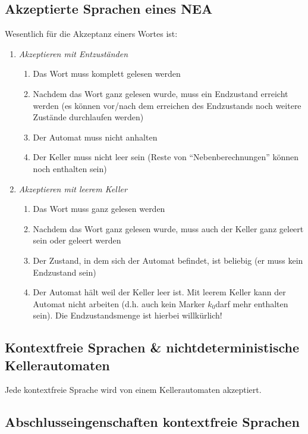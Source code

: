 \subsection{Akzeptierte Sprachen eines NEA}

Wesentlich für die Akzeptanz einers Wortes ist:
\begin{enumerate}
\item \emph{Akzeptieren mit Entzuständen}

\begin{enumerate}
\item Das Wort muss komplett gelesen werden
\item Nachdem das Wort ganz gelesen wurde, muss ein Endzustand erreicht
werden (es können vor/nach dem erreichen des Endzustands noch weitere
Zustände durchlaufen werden)
\item Der Automat muss nicht anhalten
\item Der Keller muss nicht leer sein (Reste von ``Nebenberechnungen''
können noch enthalten sein)
\end{enumerate}
\item \emph{Akzeptieren mit leerem Keller}

\begin{enumerate}
\item Das Wort muss ganz gelesen werden
\item Nachdem das Wort ganz gelesen wurde, muss auch der Keller ganz geleert
sein oder geleert werden
\item Der Zustand, in dem sich der Automat befindet, ist beliebig (er muss
kein Endzustand sein)
\item Der Automat hält weil der Keller leer ist. Mit leerem Keller kann
der Automat nicht arbeiten (d.h. auch kein Marker $k_{0}$darf mehr
enthalten sein). Die Endzustandsmenge ist hierbei willkürlich!
\end{enumerate}
\end{enumerate}

\subsection{Kontextfreie Sprachen \& nichtdeterministische Kellerautomaten}

Jede kontextfreie Sprache wird von einem Kellerautomaten akzeptiert.


\subsection{Abschlusseingenschaften kontextfreie Sprachen}

